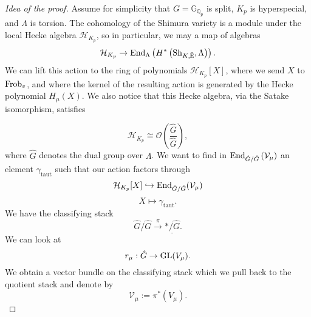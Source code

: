 \documentclass[reqno]{amsart} 
\begin{document}
\begin{proof}[Idea of the proof]
  Assume for simplicity that $G = \mathbb{G}_{\mathbb{Q}_p}$ is split, $K_p$ is hyperspecial, and $\Lambda$ is torsion.  The cohomology of the Shimura variety is a module under the local Hecke algebra $\mathcal{H}_{K_p}$, so in particular, we may a map of algebras
  \begin{equation*}
    \mathcal{H}_{K_p}
    \rightarrow \operatorname{End}_\Lambda \left( H^\ast \left( \mathrm{Sh}_{K, \bar{\mathbb{E}}}, \Lambda \right) \right).
  \end{equation*}
  We can lift this action to the ring of polynomials $\mathcal{H}_{K_p}[X]$, where we send $X$ to $\operatorname{Frob}_v$, and where the kernel of the resulting action is generated by the Hecke polynomial $H_\mu(X)$.  We also notice that this Hecke algebra, via the Satake isomorphism, satisfies

  \begin{equation*}
    \mathcal{H}_{K_p} \cong \mathcal{O} \left( \frac{\hat{G}}{\hat{G}} \right),
  \end{equation*}
  where $\hat{G}$ denotes the dual group over $\Lambda$.  We want to find in $\operatorname{End}_{\hat{G} / \hat{G}} \left( \mathcal{V}_\mu \right)$ an element $\gamma_{\mathrm{taut}}$ such that our action factors through
  \begin{equation*}
    \mathcal{H}_{K_p}[X] \hookrightarrow \operatorname{End}_{\hat{G} / \hat{G}}(\mathcal{V}_\mu)
  \end{equation*}
  \begin{equation*}
    X \mapsto \gamma_{\mathrm{taut}}.
  \end{equation*}
  We have the classifying stack
  \begin{equation*}
    \hat{G} / \hat{G} \xrightarrow{\pi} \underline{\ast / \hat{G}}.
  \end{equation*}
  We can look at
  \begin{equation*}
    r_\mu : \hat{G} \rightarrow \operatorname{GL}(V_\mu).
  \end{equation*}
  We obtain a vector bundle on the classifying stack which we pull back to the quotient stack and denote by
  \begin{equation*}
    \mathcal{V}_\mu := \pi^\ast(V_\mu).
  \end{equation*}
\end{proof}
\end{document}
